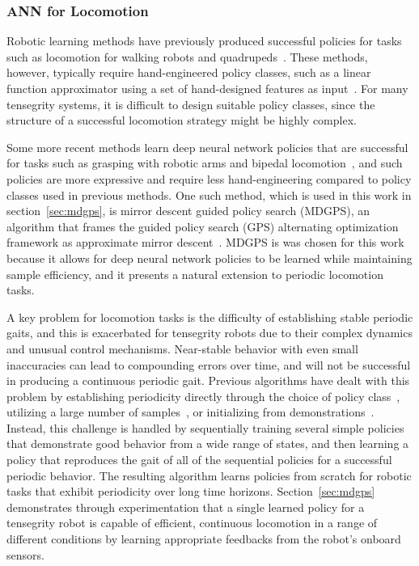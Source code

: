 \subsubsection{ANN for Locomotion}
Robotic learning methods have previously produced successful policies for tasks
such as locomotion for walking robots and
quadrupeds~\cite{tzs-spgrl-04,kp-pgrlf-04,cspd-bolg-15,kn-ldquad-11,kbps-temp-09}.
These methods, however, typically require hand-engineered policy classes, such
as a linear function approximator using a set of hand-designed features as
input~\cite{tzs-spgrl-04}.  For many tensegrity systems, it is difficult to
design suitable policy classes, since the structure of a successful locomotion
strategy might be highly complex. 

Some more recent methods learn deep neural network policies that are successful
for tasks such as grasping with robotic arms and bipedal
locomotion~\cite{slmja-trpo-15,lhphe-ccdrl-16}, and such policies are more
expressive and require less hand-engineering compared to policy classes used in
previous methods. One such method, which is used in this work in section~\ref{sec:mdgps}, is mirror
descent guided policy search (MDGPS), an algorithm that frames
the guided policy search (GPS) alternating optimization framework as approximate
mirror descent~\cite{ml-gpsam-16}. MDGPS is was chosen for this work because it allows
for deep neural network policies to be learned while maintaining sample efficiency,
and it presents a natural extension to periodic locomotion tasks.

A key problem for locomotion tasks is the difficulty of establishing stable
periodic gaits, and this is exacerbated for tensegrity robots due to their
complex dynamics and unusual control mechanisms.
Near-stable behavior with even small inaccuracies can lead to compounding errors
over time, and will not be successful in producing a continuous periodic gait.
Previous algorithms have dealt with this problem by establishing periodicity
directly through the choice of policy
class~\cite{kp-pgrlf-04,gpw-fbwrc-06,emmnc-cpg-08}, utilizing a large number of
samples~\cite{slmja-trpo-15}, or initializing from
demonstrations~\cite{lk-gps-13,la-lnnpg-14}. Instead, this challenge is handled
by sequentially training several simple policies that demonstrate good behavior
from a wide range of states, and then learning a policy that reproduces the gait
of all of the sequential policies for a successful periodic behavior. The
resulting algorithm learns policies from scratch for robotic tasks that exhibit
periodicity over long time horizons. 
Section~\ref{sec:mdgps} demonstrates through experimentation that
a single learned policy for a tensegrity robot is capable of efficient,
continuous locomotion in a range of different conditions by learning appropriate
feedbacks from the robot's onboard sensors.

